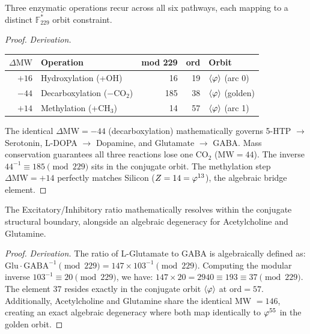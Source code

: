\begin{theorem}
Three enzymatic operations recur across all six pathways, each mapping to a distinct $\mathbb{F}_{229}^*$ orbit constraint.
\begin{proof}
\emph{Derivation.}
\begin{center}
\begin{tabular}{@{}rlrrl@{}}
\toprule
$\Delta\mathrm{MW}$ & \textbf{Operation} & \textbf{mod 229} & \textbf{ord} & \textbf{Orbit} \\
\midrule
$+16$ & Hydroxylation (+OH) & 16 & 19 & $\langle\varphi\rangle$ (arc 0) \\
$-44$ & Decarboxylation ($-\mathrm{CO}_2$) & 185 & 38 & $\langle\varphi\rangle$ (golden) \\
$+14$ & Methylation (+$\mathrm{CH}_3$) & 14 & 57 & $\langle\varphi\rangle$ (arc 1) \\
\bottomrule
\end{tabular}
\end{center}
The identical $\Delta\mathrm{MW} = -44$ (decarboxylation) mathematically governs 5-HTP $\to$ Serotonin, L-DOPA $\to$ Dopamine, and Glutamate $\to$ GABA. Mass conservation guarantees all three reactions lose one CO$_2$ ($\mathrm{MW} = 44$). The inverse $44^{-1} \equiv 185 \pmod{229}$ sits in the conjugate orbit. The methylation step $\Delta\mathrm{MW} = +14$ perfectly matches Silicon ($Z = 14 = \varphi^{13}$), the algebraic bridge element.
\qedhere
\end{proof}
\end{theorem}

\begin{theorem}
The Excitatory/Inhibitory ratio mathematically resolves within the conjugate structural boundary, alongside an algebraic degeneracy for Acetylcholine and Glutamine.
\begin{proof}
\emph{Derivation.} The ratio of L-Glutamate to GABA is algebraically defined as:
$\mathrm{Glu} \cdot \mathrm{GABA}^{-1} \pmod{229} = 147 \times 103^{-1} \pmod{229}$.
Computing the modular inverse $103^{-1} \equiv 20 \pmod{229}$, we have:
$147 \times 20 = 2940 \equiv 193 \equiv 37 \pmod{229}$.
The element 37 resides exactly in the conjugate orbit $\langle\varphi\rangle$ at $\mathrm{ord} = 57$. Additionally, Acetylcholine and Glutamine share the identical MW $= 146$, creating an exact algebraic degeneracy where both map identically to $\varphi^{55}$ in the golden orbit.
\qedhere
\end{proof}
\end{theorem}

